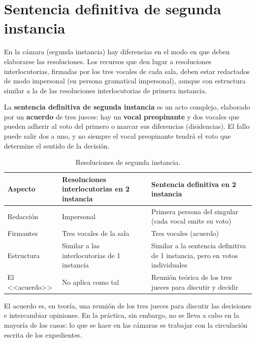 \documentclass[12pt,oneside]{book}
\renewcommand{\arraystretch}{1.15}
\begin{document}

\section{Sentencia definitiva de segunda instancia}

En la cámara (segunda instancia) hay diferencias en el modo en que deben elaborarse las resoluciones. Los recursos que den lugar a resoluciones interlocutorias, firmadas por los tres vocales de cada sala, deben estar redactados de modo impersonal (en persona gramatical impersonal), aunque con estructura similar a la de las resoluciones interlocutorias de primera instancia.

La \textbf{sentencia definitiva de segunda instancia} es un acto complejo, elaborado por un \textbf{acuerdo} de tres jueces: hay un \textbf{vocal preopinante} y dos vocales que pueden adherir al voto del primero o marcar sus diferencias (disidencias). El fallo puede salir dos a uno, y no siempre el vocal preopinante tendrá el voto que determine el sentido de la decisión.

\begin{table}[H]
\centering
\small
\renewcommand{\arraystretch}{1.25}
\begin{tabularx}{\textwidth}{
    >{\raggedright\arraybackslash}p{2.4cm}
    >{\raggedright\arraybackslash}X
    >{\raggedright\arraybackslash}X
}
\toprule
\textbf{Aspecto} &
\textbf{Resoluciones interlocutorias en 2\textordfeminine{} instancia} &
\textbf{Sentencia definitiva en 2\textordfeminine{} instancia} \\
\midrule
Redacción & Impersonal & Primera persona del singular (cada vocal emite su voto) \\
Firmantes & Tres vocales de la sala & Tres vocales (acuerdo) \\
Estructura & Similar a las interlocutorias de 1\textordfeminine{} instancia & Similar a la sentencia definitiva de 1\textordfeminine{} instancia, pero en votos individuales \\
El <<acuerdo>> & No aplica como tal & Reunión teórica de los tres jueces para discutir y decidir \\
\bottomrule
\end{tabularx}
\caption{Resoluciones de segunda instancia.}
\end{table}

El acuerdo es, en teoría, una reunión de los tres jueces para discutir las decisiones e intercambiar opiniones. En la práctica, sin embargo, no se lleva a cabo en la mayoría de los casos: lo que se hace en las cámaras es trabajar con la circulación escrita de los expedientes.
\end{document}
